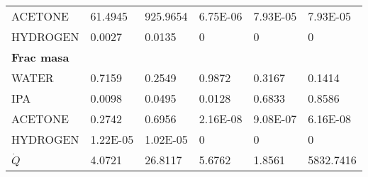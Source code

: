 \begin{table}[H]
\begin{tabular}{llllll}
    ACETONE        & 61.4945  & 925.9654  & 6.75E-06 & 7.93E-05 & 7.93E-05   \\
    HYDROGEN       & 0.0027   & 0.0135    & 0        & 0        & 0          \\
    \textbf{Frac masa} &          &           &          &          &            \\
    WATER          & 0.7159   & 0.2549    & 0.9872   & 0.3167   & 0.1414     \\
    IPA            & 0.0098   & 0.0495    & 0.0128   & 0.6833   & 0.8586     \\
    ACETONE        & 0.2742   & 0.6956    & 2.16E-08 & 9.08E-07 & 6.16E-08   \\
    HYDROGEN       & 1.22E-05 & 1.02E-05  & 0        & 0        & 0          \\
    $\dot{Q}$     & 4.0721   & 26.8117   & 5.6762   & 1.8561   & 5832.7416 \\ \hline
    \end{tabular}
\end{table}
    